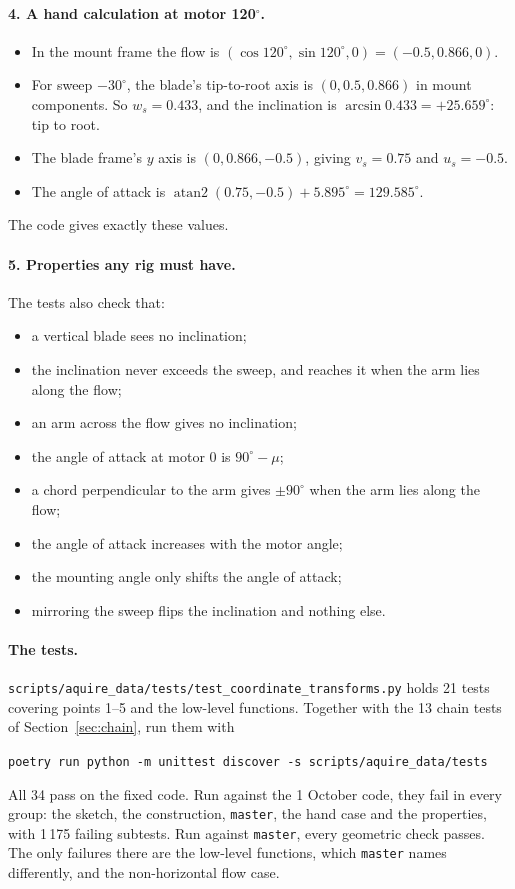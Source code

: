 \documentclass[11pt]{article}
\newcommand{\code}[1]{\texttt{#1}}
\begin{document}
\paragraph{4. A hand calculation at motor 120$^\circ$.}
\begin{itemize}
  \item In the mount frame the flow is $(\cos120^\circ, \sin120^\circ, 0) =
        (-0.5, 0.866, 0)$.
  \item For sweep $-30^\circ$, the blade's tip-to-root axis is
        $(0, 0.5, 0.866)$ in mount components. So
        $w_s = 0.433$, and the inclination is
        $\arcsin 0.433 = +25.659^\circ$: tip to root.
  \item The blade frame's $y$ axis is $(0, 0.866, -0.5)$, giving
        $v_s = 0.75$ and $u_s = -0.5$.
  \item The angle of attack is
        $\operatorname{atan2}(0.75, -0.5) + 5.895^\circ = 129.585^\circ$.
\end{itemize}
The code gives exactly these values.

\paragraph{5. Properties any rig must have.} The tests also check that:
\begin{itemize}
  \item a vertical blade sees no inclination;
  \item the inclination never exceeds the sweep, and reaches it when the arm
        lies along the flow;
  \item an arm across the flow gives no inclination;
  \item the angle of attack at motor 0 is $90^\circ - \mu$;
  \item a chord perpendicular to the arm gives $\pm90^\circ$ when the arm
        lies along the flow;
  \item the angle of attack increases with the motor angle;
  \item the mounting angle only shifts the angle of attack;
  \item mirroring the sweep flips the inclination and nothing else.
\end{itemize}

\paragraph{The tests.} \code{scripts/aquire\_data/tests/test\_coordinate\_transforms.py}
holds 21 tests covering points 1--5 and the low-level functions. Together
with the 13 chain tests of Section~\ref{sec:chain}, run them with
\begin{center}
\code{poetry run python -m unittest discover -s scripts/aquire\_data/tests}
\end{center}
All 34 pass on the fixed code. Run against the 1 October code, they fail
in every group: the sketch, the construction, \code{master}, the hand case
and the properties, with 1\,175 failing subtests. Run against
\code{master}, every geometric check passes. The only failures there are
the low-level functions, which \code{master} names differently, and the
non-horizontal flow case.
\end{document}
